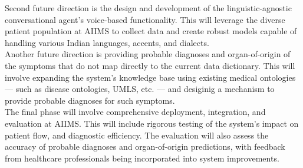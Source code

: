 \noindent Second future direction is the design and development of the linguistic-agnostic conversational agent's voice-based functionality. This will leverage the diverse patient population at AIIMS to collect data and create robust models capable of handling various Indian languages, accents, and dialects.\\[\baselineskip]

\noindent Another future direction is providing probable diagnoses and organ-of-origin of the symptoms that do not map directly to the current data dictionary. This will involve expanding the system's knowledge base using existing medical ontologies --- such as disease ontologies, UMLS, etc. --- and desiginig a mechanism to provide probable diagnoses for such symptoms.\\[\baselineskip]

\noindent The final phase will involve comprehensive deployment, integration, and evaluation at AIIMS. This will include rigorous testing of the system's impact on patient flow, and diagnostic efficiency. The evaluation will also assess the accuracy of probable diagnoses and organ-of-origin predictions, with feedback from healthcare professionals being incorporated into system improvements.